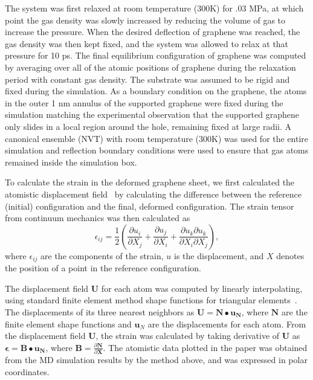 The system was first relaxed at room temperature (300K) for .03 MPa, at which point the gas density was slowly increased by reducing the volume of gas to increase the pressure.  When the desired deflection of graphene was reached, the gas density was then kept fixed, and the system was allowed to relax at that pressure for 10 ps.  The final equilibrium configuration of graphene was computed by averaging over all of the atomic positions of graphene during the relaxation period with constant gas density. The substrate was assumed to be rigid and fixed during the simulation.  As a boundary condition on the graphene, the atoms in the outer 1 nm annulus of the supported graphene were fixed during the simulation matching the experimental observation that the supported graphene only slides in a local region around the hole, remaining fixed at large radii.  A canonical ensemble (NVT) with room temperature (300K) was used for the entire simulation and reflection boundary conditions were used to ensure that gas atoms remained inside the simulation box.  

To calculate the strain in the deformed graphene sheet, we first calculated the atomistic displacement field~\cite{ZimmermanIJSS2009} by calculating the difference between the reference (initial) configuration and the final, deformed configuration.  The strain tensor from continuum mechanics was then calculated as
\begin{equation} \label{eq:straindisp}
\epsilon_{ij}=\frac{1}{2}\left(\frac{\partial {u_i}}{\partial {X_j}} + \frac{\partial {u_j}}{\partial {X_i}} + \frac{\partial{u_k}\partial{u_k}}{\partial{X_i}\partial{X_j}}\right),
\end{equation}
where $\epsilon_{ij}$ are the components of the strain, $u$ is the displacement, and $X$ denotes the position of a point in the reference configuration.

The displacement field $\mathbf{U}$ for each atom was computed by linearly interpolating, using standard finite element method shape functions for triangular elements~\cite{hughes1987}. The displacements of its three nearest neighbors as $\mathbf{U}=\mathbf{N}\bullet\mathbf{u_N}$, where $\mathbf{N}$ are the finite element shape functions and $\mathbf{u}_{N}$ are the displacements for each atom.  From the displacement field $\mathbf{U}$, the strain was calculated by taking derivative of $\mathbf{U}$ as $\mathbf{\epsilon}=\mathbf{B}\bullet\mathbf{u_N}$, where $\mathbf{B}=\frac{\partial \mathbf{N}}{\partial \mathbf{X}}$. The atomistic data plotted in the paper was obtained from the MD simulation results by the method above, and was expressed in polar coordinates. 

